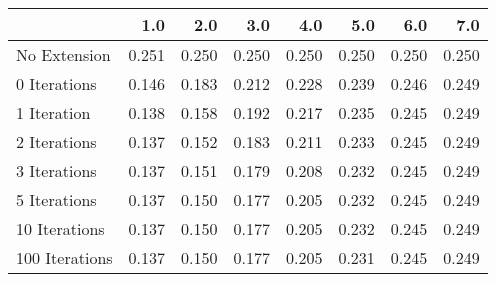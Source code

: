 \begin{tabular}{lrrrrrrr}
\toprule
{} &   1.0 &   2.0 &   3.0 &   4.0 &   5.0 &   6.0 &   7.0 \\
\midrule
No Extension   & 0.251 & 0.250 & 0.250 & 0.250 & 0.250 & 0.250 & 0.250 \\
0 Iterations   & 0.146 & 0.183 & 0.212 & 0.228 & 0.239 & 0.246 & 0.249 \\
1 Iteration    & 0.138 & 0.158 & 0.192 & 0.217 & 0.235 & 0.245 & 0.249 \\
2 Iterations   & 0.137 & 0.152 & 0.183 & 0.211 & 0.233 & 0.245 & 0.249 \\
3 Iterations   & 0.137 & 0.151 & 0.179 & 0.208 & 0.232 & 0.245 & 0.249 \\
5 Iterations   & 0.137 & 0.150 & 0.177 & 0.205 & 0.232 & 0.245 & 0.249 \\
10 Iterations  & 0.137 & 0.150 & 0.177 & 0.205 & 0.232 & 0.245 & 0.249 \\
100 Iterations & 0.137 & 0.150 & 0.177 & 0.205 & 0.231 & 0.245 & 0.249 \\
\bottomrule
\end{tabular}
